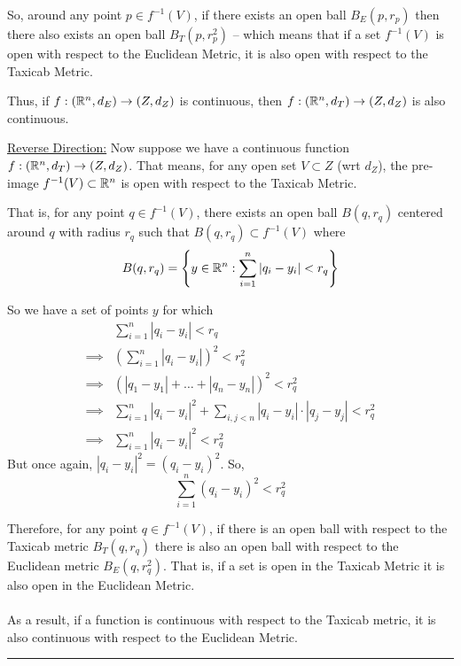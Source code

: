 \documentclass[twoside]{article}
\begin{document}
So, around any point $p \in f^{-1}(V)$, if there exists an open ball $B_{E} (p, r_p)$ then there also exists an open ball $B_{T} (p, r_p^2)$ -- which means that if a set $f^{-1}(V)$ is open with respect to the Euclidean Metric, it is also open with respect to the Taxicab Metric.

Thus, if $f : (\mathbb{R}^n, d_E) \rightarrow (Z, d_Z)$ is continuous, then $f : (\mathbb{R}^n, d_T) \rightarrow (Z, d_Z)$ is also continuous.
\vskip 0.5cm 

\underline{Reverse Direction:} Now suppose we have a continuous function $f : (\mathbb{R}^n, d_T) \rightarrow (Z, d_Z)$. That means, for any open set $V \subset Z$ (wrt $d_Z$), the pre-image $f^{-1}(V) \subset \mathbb{R}^n$ is open with respect to the Taxicab Metric. 

That is, for any point $q \in f^{-1}(V)$, there exists an open ball $B(q, r_q)$ centered around $q$ with radius $r_q$ such that $B(q, r_q) \subset f^{-1}(V)$ where 
\[ B(q, r_q) = \left\{ y \in \mathbb{R}^n : \sum_{i = 1}^{n} |q_i - y_i| < r_q  \right\} \]

So we have a set of points $y$ for which
\begin{align*}
   &\sum_{i = 1}^{n} |q_i - y_i| < r_q \\
   \implies &\left( \sum_{i = 1}^{n} |q_i - y_i| \right)^2 < r_q^2 \\
   \implies &\left(|q_1 - y_1| + \dots + |q_n - y_n| \right)^2 < r_q^2 \\
   \implies &\sum_{i = 1}^{n} |q_i - y_i|^2 + \sum_{i,j < n} |q_i - y_i|\cdot|q_j - y_j| < r_q^2 \\
   \implies &\sum_{i = 1}^{n} |q_i - y_i|^2 < r_q^2
\end{align*}
But once again, $|q_i - y_i|^2 = (q_i - y_i)^2$. So,
\[ \boxed{\sum_{i = 1}^{n} (q_i - y_i)^2 < r_q^2} \]

Therefore, for any point $q \in f^{-1}(V)$, if there is an open ball with respect to the Taxicab metric $B_T(q, r_q)$ there is also an open ball with respect to the Euclidean metric $B_E(q, r_q^2)$. That is, if a set is open in the Taxicab Metric it is also open in the Euclidean Metric.
\\
\\
As a result, if a function is continuous with respect to the Taxicab metric, it is also continuous with respect to the Euclidean Metric.
\vskip 0.25cm
\hrule
\vskip 1cm
 
\end{document}
